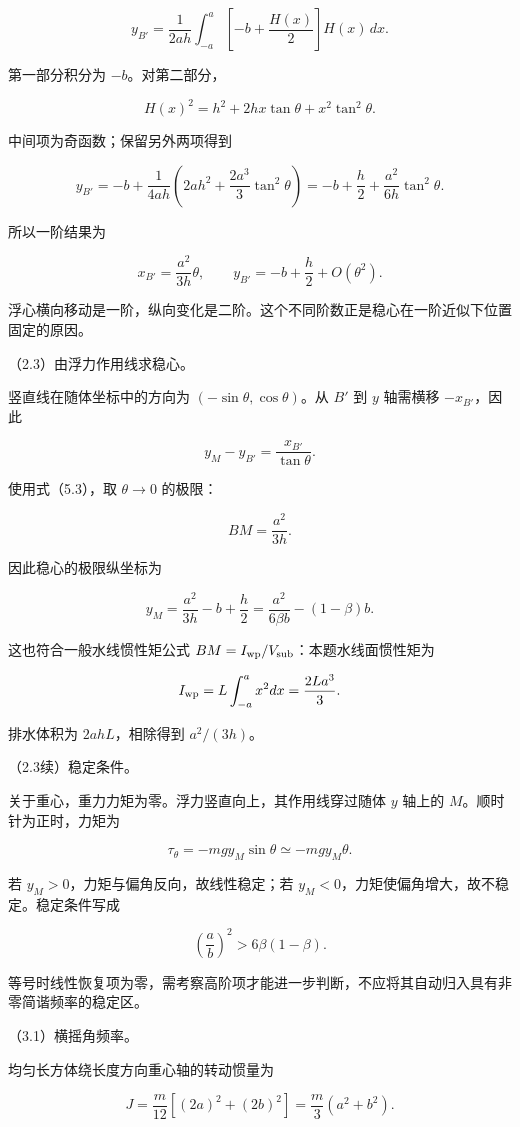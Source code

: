 \documentclass[12pt,a4paper,fontset=fandol]{ctexart}
\begin{document}
\[
y_{B'}=\frac{1}{2ah}\int_{-a}^a
\left[-b+\frac{H(x)}2\right]H(x)\,dx.
\]

第一部分积分为 \(-b\)。对第二部分，

\[
H(x)^2=h^2+2hx\tan\theta+x^2\tan^2\theta.
\]

中间项为奇函数；保留另外两项得到

\[
y_{B'}=-b+\frac{1}{4ah}
\left(2ah^2+\frac{2a^3}{3}\tan^2\theta\right)
=-b+\frac h2+\frac{a^2}{6h}\tan^2\theta.
\tag{5.4}
\]

所以一阶结果为

\[
\boxed{x_{B'}=\frac{a^2}{3h}\theta,\qquad
y_{B'}=-b+\frac h2+O(\theta^2).}
\]

浮心横向移动是一阶，纵向变化是二阶。这个不同阶数正是稳心在一阶近似下位置固定的原因。

（2.3）由浮力作用线求稳心。

竖直线在随体坐标中的方向为 \((-\sin\theta,\cos\theta)\)。从 \(B'\) 到
\(y\) 轴需横移 \(-x_{B'}\)，因此

\[
y_M-y_{B'}=\frac{x_{B'}}{\tan\theta}.
\]

使用式（5.3），取 \(\theta\to0\) 的极限：

\[
\boxed{BM=\frac{a^2}{3h}.}
\]

因此稳心的极限纵坐标为

\[
\boxed{y_M=\frac{a^2}{3h}-b+\frac h2
=\frac{a^2}{6\beta b}-(1-\beta)b.}
\tag{5.5}
\]

这也符合一般水线惯性矩公式
\(BM=I_{\rm wp}/V_{\rm sub}\)：本题水线面惯性矩为

\[
I_{\rm wp}=L\int_{-a}^a x^2dx=\frac{2La^3}{3}.
\]

排水体积为 \(2ahL\)，相除得到 \(a^2/(3h)\)。

（2.3续）稳定条件。

关于重心，重力力矩为零。浮力竖直向上，其作用线穿过随体 \(y\) 轴上的
\(M\)。顺时针为正时，力矩为

\[
\tau_\theta=-mgy_M\sin\theta\simeq-mgy_M\theta.
\tag{5.6}
\]

若 \(y_M>0\)，力矩与偏角反向，故线性稳定；若
\(y_M<0\)，力矩使偏角增大，故不稳定。稳定条件写成

\[
\boxed{\left(\frac ab\right)^2>6\beta(1-\beta).}
\tag{5.7}
\]

等号时线性恢复项为零，需考察高阶项才能进一步判断，不应将其自动归入具有非零简谐频率的稳定区。

（3.1）横摇角频率。

均匀长方体绕长度方向重心轴的转动惯量为

\[
J=\frac{m}{12}[(2a)^2+(2b)^2]
=\frac m3(a^2+b^2).
\]
\end{document}
